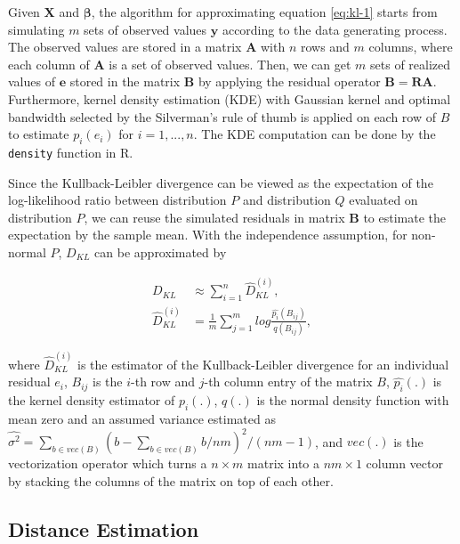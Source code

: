 \documentclass[]{interact}
\theoremstyle{plain}%
\theoremstyle{definition}
\theoremstyle{remark}
\begin{document}
Given \(\boldsymbol{X}\) and \(\boldsymbol{\beta}\), the algorithm for
approximating equation \ref{eq:kl-1} starts from simulating \(m\) sets
of observed values \(\boldsymbol{y}\) according to the data generating
process. The observed values are stored in a matrix \(\boldsymbol{A}\)
with \(n\) rows and \(m\) columns, where each column of
\(\boldsymbol{A}\) is a set of observed values. Then, we can get \(m\)
sets of realized values of \(\boldsymbol{e}\) stored in the matrix
\(\boldsymbol{B}\) by applying the residual operator
\(\boldsymbol{B} = \boldsymbol{R}\boldsymbol{A}\). Furthermore, kernel
density estimation (KDE) with Gaussian kernel and optimal bandwidth
selected by the Silverman's rule of thumb \citep{silverman2018density}
is applied on each row of \(B\) to estimate \(p_i(e_i)\) for
\(i = 1, ..., n\). The KDE computation can be done by the
\texttt{density} function in R.

Since the Kullback-Leibler divergence can be viewed as the expectation
of the log-likelihood ratio between distribution \(P\) and distribution
\(Q\) evaluated on distribution \(P\), we can reuse the simulated
residuals in matrix \(\boldsymbol{B}\) to estimate the expectation by
the sample mean. With the independence assumption, for non-normal \(P\),
\(D_{KL}\) can be approximated by

\begin{align}
\label{eq:kl-3}
D_{KL} &\approx \sum_{i = 1}^{n} \hat{D}_{KL}^{(i)}, \\
\hat{D}_{KL}^{(i)} &= \frac{1}{m}\sum_{j = 1}^{m} log\frac{\hat{p_i}(B_{ij})}{q(B_{ij})},
\end{align}

\noindent where \(\hat{D}_{KL}^{(i)}\) is the estimator of the
Kullback-Leibler divergence for an individual residual \(e_i\),
\(B_{ij}\) is the \(i\)-th row and \(j\)-th column entry of the matrix
\(B\), \(\hat{p_i}(.)\) is the kernel density estimator of \(p_i(.)\),
\(q(.)\) is the normal density function with mean zero and an assumed
variance estimated as
\(\widehat{\sigma^2} = \sum_{b \in vec(B)}(b - \sum_{b \in vec(B)} b/nm)^2/(nm - 1)\),
and \(vec(.)\) is the vectorization operator which turns a
\(n \times m\) matrix into a \(nm \times 1\) column vector by stacking
the columns of the matrix on top of each other.

\subsection{Distance Estimation}\label{distance-estimation}
\end{document}
